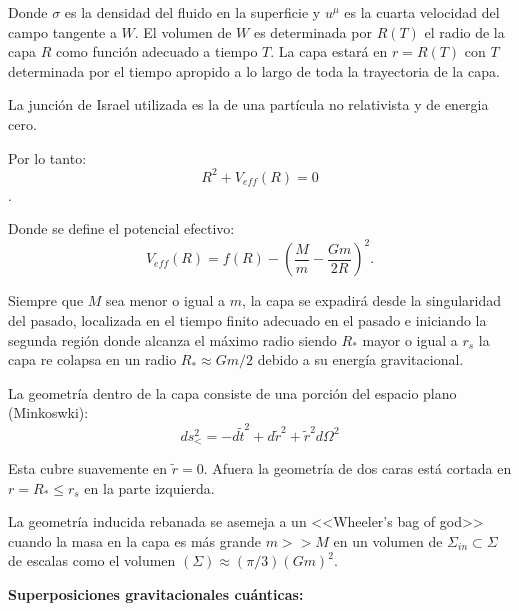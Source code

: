 \documentclass[letterpaper]{article}
\begin{document}
\newpage
\begin{justify}
Donde \(\sigma\) es la densidad del fluido en la superficie y \(u^\mu\) es la cuarta velocidad del campo tangente a \(W\). El volumen de \(W\) es determinada por \(R\left(T\right)\)
el radio de la capa \(R\) como función adecuado a tiempo \(T\). La capa estará en \(r=R\left(T\right)\) con \(T\) determinada por el tiempo apropido a lo largo de toda la trayectoria de la capa.
\end{justify}
\begin{justify}
La junción de Israel utilizada es la de una partícula no relativista y de energia cero.
\end{justify}
\begin{justify}
Por lo tanto:\[R^2+V_{eff}\left(R\right)=0\].
\end{justify}
\begin{justify}
Donde se define el potencial efectivo:\[V_{eff}\left(R\right)=f\left(R\right)-\left(\frac{M}{m}-\frac{Gm}{2R}\right)^2.\]
\end{justify}
\begin{justify}
Siempre que \(M\) sea menor o igual a  \(m\), la capa se expadirá desde la singularidad del pasado, localizada en el tiempo finito adecuado en el pasado e iniciando la segunda región donde alcanza el máximo
radio siendo \(R_*\) mayor o igual a \(r_s\) la capa re colapsa en un radio \(R_* \approx Gm/2\) debido a su  energía gravitacional.
\end{justify}
\begin{justify}
La geometría dentro de la capa consiste de una porción del espacio plano \; \; (Minkoswki):\[ds^2_< =  -d\tilde{t}^2 + d\tilde{r}^2 + \tilde{r}^2 d\Omega^2\]
\end{justify}
\begin{justify}
Esta cubre suavemente en \(\tilde{r}=0\). Afuera la geometría de dos caras está cortada en \(r=R_* \leq r_s\) en la parte izquierda.
\end{justify}
\begin{justify}
La geometría inducida rebanada se asemeja a un <<Wheeler's bag of god>> cuando la masa en la capa es más grande \(m>>M\) en un volumen de \(\Sigma _{in} \subset \Sigma\)
de escalas como el volumen \(\left(\Sigma\right)\approx \left(\pi/3\right)\left(Gm\right)^2 \).
\end{justify}
\vspace{\baselineskip}
\begin{justify}
\textbf{Superposiciones gravitacionales cuánticas:}
\end{justify}
\end{document}
